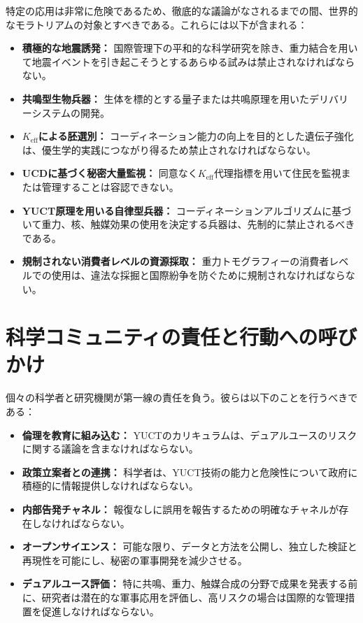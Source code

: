 \documentclass[12pt,a4paper]{article}
\theoremstyle{remark}
\newcommand{\Keff}{K_{\mathrm{eff}}}
\begin{document}
	特定の応用は非常に危険であるため、徹底的な議論がなされるまでの間、世界的なモラトリアムの対象とすべきである。これらには以下が含まれる：
	\begin{itemize}[leftmargin=*]
		\item \textbf{積極的な地震誘発：} 国際管理下の平和的な科学研究を除き、重力結合を用いて地震イベントを引き起こそうとするあらゆる試みは禁止されなければならない。
		\item \textbf{共鳴型生物兵器：} 生体を標的とする量子または共鳴原理を用いたデリバリーシステムの開発。
		\item \textbf{\(\Keff\)による胚選別：} コーディネーション能力の向上を目的とした遺伝子強化は、優生学的実践につながり得るため禁止されなければならない。
		\item \textbf{UCDに基づく秘密大量監視：} 同意なく\(\Keff\)代理指標を用いて住民を監視または管理することは容認できない。
		\item \textbf{YUCT原理を用いる自律型兵器：} コーディネーションアルゴリズムに基づいて重力、核、触媒効果の使用を決定する兵器は、先制的に禁止されるべきである。
		\item \textbf{規制されない消費者レベルの資源採取：} 重力トモグラフィーの消費者レベルでの使用は、違法な採掘と国際紛争を防ぐために規制されなければならない。
	\end{itemize}
	
	\section{科学コミュニティの責任と行動への呼びかけ}
	\label{sec:scientists}
	
	個々の科学者と研究機関が第一線の責任を負う。彼らは以下のことを行うべきである：
	\begin{itemize}[leftmargin=*]
		\item \textbf{倫理を教育に組み込む：} YUCTのカリキュラムは、デュアルユースのリスクに関する議論を含まなければならない。
		\item \textbf{政策立案者との連携：} 科学者は、YUCT技術の能力と危険性について政府に積極的に情報提供しなければならない。
		\item \textbf{内部告発チャネル：} 報復なしに誤用を報告するための明確なチャネルが存在しなければならない。
		\item \textbf{オープンサイエンス：} 可能な限り、データと方法を公開し、独立した検証と再現性を可能にし、秘密の軍事開発を減少させる。
		\item \textbf{デュアルユース評価：} 特に共鳴、重力、触媒合成の分野で成果を発表する前に、研究者は潜在的な軍事応用を評価し、高リスクの場合は国際的な管理措置を促進しなければならない。
	\end{itemize}
	
\end{document}
